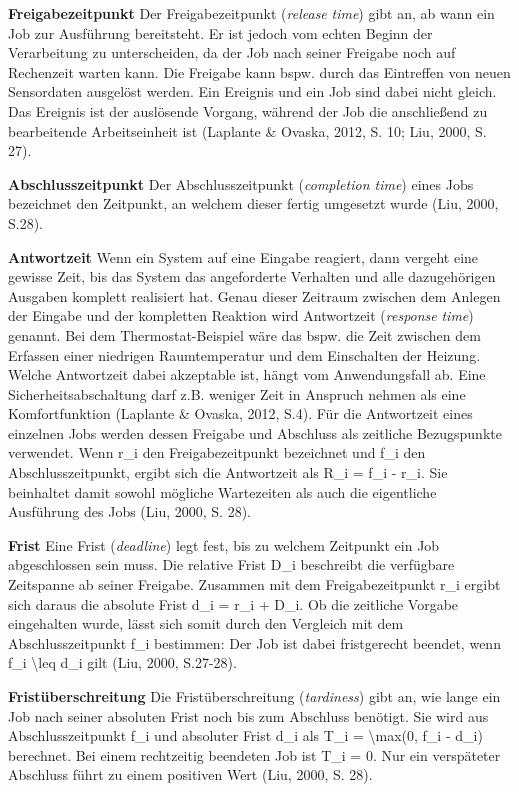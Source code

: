 \textbf{Freigabezeitpunkt }Der Freigabezeitpunkt (\emph{release} \emph{time}) gibt an, ab wann ein Job zur Ausf{\"u}hrung bereitsteht. Er ist jedoch vom echten Beginn der Verarbeitung zu unterscheiden, da der Job nach seiner Freigabe noch auf Rechenzeit warten kann. Die Freigabe kann bspw. durch das Eintreffen von neuen Sensordaten ausgel{\"o}st werden. Ein Ereignis und ein Job sind dabei nicht gleich. Das Ereignis ist der ausl{\"o}sende Vorgang, w{\"a}hrend der Job die anschlie{\ss}end zu bearbeitende Arbeitseinheit ist (Laplante \& Ovaska, 2012, S. 10; Liu, 2000, S. 27).

\textbf{Abschlusszeitpunkt }Der Abschlusszeitpunkt (\emph{completion time}) eines Jobs bezeichnet den Zeitpunkt, an welchem dieser fertig umgesetzt wurde (Liu, 2000, S.28).

\textbf{Antwortzeit} Wenn ein System auf eine Eingabe reagiert, dann vergeht eine gewisse Zeit, bis das System das angeforderte Verhalten und alle dazugeh{\"o}rigen Ausgaben komplett realisiert hat. Genau dieser Zeitraum zwischen dem Anlegen der Eingabe und der kompletten Reaktion wird Antwortzeit (\emph{response} \emph{time}) genannt. Bei dem Thermostat-Beispiel w{\"a}re das bspw. die Zeit zwischen dem Erfassen einer niedrigen Raumtemperatur und dem Einschalten der Heizung. Welche Antwortzeit dabei akzeptable ist, h{\"a}ngt vom Anwendungsfall ab. Eine Sicherheitsabschaltung darf z.B. weniger Zeit in Anspruch nehmen als eine Komfortfunktion (Laplante \& Ovaska, 2012, S.4). F{\"u}r die Antwortzeit eines einzelnen Jobs werden dessen Freigabe und Abschluss als zeitliche Bezugspunkte verwendet. Wenn r\_i den Freigabezeitpunkt bezeichnet und f\_i den Abschlusszeitpunkt, ergibt sich die Antwortzeit als R\_i = f\_i - r\_i. Sie beinhaltet damit sowohl m{\"o}gliche Wartezeiten als auch die eigentliche Ausf{\"u}hrung des Jobs (Liu, 2000, S. 28).

\textbf{Frist }Eine Frist (\emph{deadline}) legt fest, bis zu welchem Zeitpunkt ein Job abgeschlossen sein muss. Die relative Frist D\_i beschreibt die verf{\"u}gbare Zeitspanne ab seiner Freigabe. Zusammen mit dem Freigabezeitpunkt r\_i ergibt sich daraus die absolute Frist d\_i = r\_i + D\_i. Ob die zeitliche Vorgabe eingehalten wurde, l{\"a}sst sich somit durch den Vergleich mit dem Abschlusszeitpunkt f\_i bestimmen: Der Job ist dabei fristgerecht beendet, wenn f\_i \textbackslash{}leq d\_i gilt (Liu, 2000, S.27-28).

\textbf{Frist{\"u}berschreitung }Die Frist{\"u}berschreitung (\emph{tardiness}) gibt an, wie lange ein Job nach seiner absoluten Frist noch bis zum Abschluss ben{\"o}tigt. Sie wird aus Abschlusszeitpunkt f\_i und absoluter Frist d\_i als T\_i = \textbackslash{}max(0, f\_i - d\_i) berechnet. Bei einem rechtzeitig beendeten Job ist T\_i = 0. Nur ein versp{\"a}teter Abschluss f{\"u}hrt zu einem positiven Wert (Liu, 2000, S. 28).

